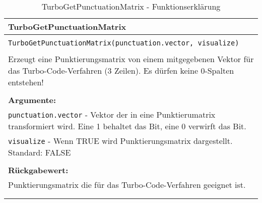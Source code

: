\begin{longtable}{|p{\textwidth}|}
\hline
\rowcolor{lightblue}TurboGetPunctuationMatrix\\
\hline
\\
\texttt{TurboGetPunctuationMatrix(punctuation.vector, visualize)}\\
\\
Erzeugt eine Punktierungsmatrix von einem mitgegebenen Vektor für das Turbo-Code-Verfahren (3 Zeilen). Es dürfen keine 0-Spalten entstehen!\\
\\
\textbf{Argumente:}\\
\texttt{punctuation.vector} - Vektor der in eine Punktierumatrix transformiert wird. Eine 1 behaltet das Bit, eine 0 verwirft das Bit.\\
\texttt{visualize} - Wenn TRUE wird Punktierungsmatrix dargestellt. Standard: FALSE\\
\\
\textbf{Rückgabewert:}\\
Punktierungsmatrix die für das Turbo-Code-Verfahren geeignet ist.\\
\\
\hline
\caption{TurboGetPunctuationMatrix - Funktionserklärung}
\end{longtable}